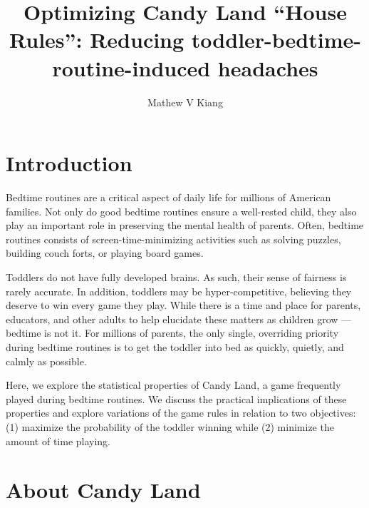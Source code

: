 \documentclass[letterpaper,9pt,twocolumn,twoside,]{pinp}
\title{Optimizing Candy Land ``House Rules'': Reducing
toddler-bedtime-routine-induced headaches}
\author[a,b]{Mathew V Kiang}
\affil[a]{Instructor, Department of Epidemiology and Population Health, Stanford
University}
\affil[b]{Fellow, Harvard FXB Center for Health and Human Rights, Harvard
University}
\begin{document}
\verticaladjustment{-2pt}

\maketitle
\thispagestyle{firststyle}



\hypertarget{introduction}{%
\section{Introduction}\label{introduction}}

Bedtime routines are a critical aspect of daily life for millions of
American families. Not only do good bedtime routines ensure a
well-rested child, they also play an important role in preserving the
mental health of parents. Often, bedtime routines consists of
screen-time-minimizing activities such as solving puzzles, building
couch forts, or playing board games.

Toddlers do not have fully developed brains. As such, their sense of
fairness is rarely accurate. In addition, toddlers may be
hyper-competitive, believing they deserve to win every game they play.
While there is a time and place for parents, educators, and other adults
to help elucidate these matters as children grow --- bedtime is not it.
For millions of parents, the only single, overriding priority during
bedtime routines is to get the toddler into bed as quickly, quietly, and
calmly as possible.

Here, we explore the statistical properties of Candy Land, a game
frequently played during bedtime routines. We discuss the practical
implications of these properties and explore variations of the game
rules in relation to two objectives: (1) maximize the probability of the
toddler winning while (2) minimize the amount of time playing.

\hypertarget{about-candy-land}{%
\section{About Candy Land}\label{about-candy-land}}
\end{document}
